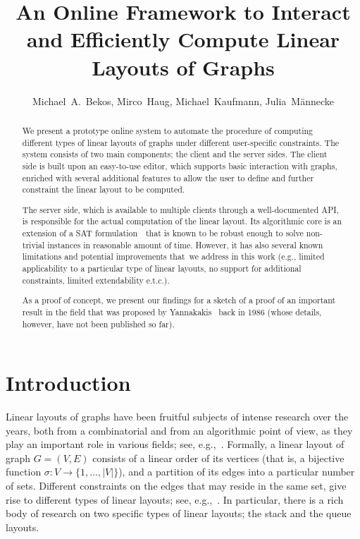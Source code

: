 \documentclass[runningheads]{llncs}
\author{Michael~A.~Bekos, Mirco~Haug, Michael~Kaufmann, Julia~M\"annecke}
\title{An Online Framework to Interact and Efficiently Compute Linear Layouts of Graphs}
\institute{
Institut f\"ur Informatik, Universit\"at T\"ubingen, T\"ubingen, Germany\\
\texttt{\{bekos,mk\}@informatik.uni-tuebingen.de}\\
\texttt{\{mirco.haug,julia.maennecke\}@student.uni-tuebingen.de}
}
\begin{document}
\maketitle

\begin{abstract}
We present a prototype online system to automate the procedure of computing different types of linear layouts of graphs under different user-specific constraints. The system consists of two main components; the client and the server sides. The client side is built upon an easy-to-use editor, which supports basic interaction with graphs, enriched with several additional features to allow the user to define and further constraint the linear layout to be computed. 

The server side, which is available to multiple clients through a well-documented API, is responsible for the actual computation of the linear layout. Its algorithmic core is an extension of a SAT formulation~\cite{DBLP:conf/gd/Bekos0Z15}~that is known to be robust enough to solve non-trivial instances in reasonable amount of time. However, it  has also several known limitations and potential improvements that~we address in this work (e.g., limited applicability to a particular type of linear layouts, no support for additional constraints, limited extendability e.t.c.). 

As a proof of concept, we present our findings for a sketch of a proof of an important result in the field that was proposed by Yannakakis~\cite{DBLP:conf/stoc/Yannakakis86} back in 1986 (whose details, however, have not been published so far).
\end{abstract}

\section{Introduction}
\label{sec:introduction}

Linear layouts of graphs have been fruitful subjects of intense research over the years, both from a combinatorial and from an algorithmic point of view, as they play an important role in various fields; see, e.g.,~\cite{DBLP:journals/dmtcs/DujmovicW04}. Formally, a linear layout of graph $G=(V,E)$ consists of a linear order of its vertices (that is, a bijective function $\sigma: V \rightarrow \{1,\ldots,|V|\}$), and a partition of its edges into a particular number of sets. Different constraints on the edges that may reside in the same set, give rise to different types of linear layouts; see, e.g.,~\cite{DBLP:conf/wg/AlamBG0P18,DBLP:journals/ejc/BinucciGHL18,DBLP:journals/siamcomp/HeathR92,DBLP:conf/gd/Pupyrev17,DBLP:journals/jcss/Yannakakis89}. In particular, there is a rich body of research on two specific types of linear layouts; the stack and the queue layouts. 
\end{document}
